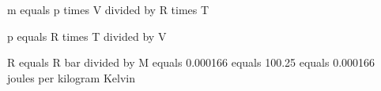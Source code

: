 m equals p times V divided by R times T

p equals R times T divided by V

R equals R bar divided by M equals 0.000166 equals 100.25 equals 0.000166 joules per kilogram Kelvin